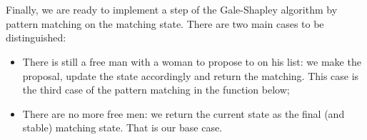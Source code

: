 {\begin{code}
\AgdaSpace{}%
\AgdaSymbol{(}\AgdaSpace{}%
\AgdaSpace{}%
\AgdaSymbol{)))}\<%
\\
%
\>[16]\AgdaOperator{\AgdaInductiveConstructor{,}}\<%
\\
%
\>[16]\AgdaSpace{}%
\AgdaSymbol{(}\AgdaSpace{}%
\AgdaSymbol{(}\AgdaSpace{}%
\AgdaOperator{\AgdaInductiveConstructor{,}}\AgdaSpace{}%
\AgdaSymbol{)}\AgdaSpace{}%
\AgdaSpace{}%
\AgdaSymbol{(}\AgdaSpace{}%
\AgdaSpace{}%
\AgdaSymbol{))}\<%
\end{code}

Finally, we are ready to implement a step of the Gale-Shapley algorithm by pattern matching on the matching state. There are two main cases to be distinguished:

\begin{itemize}
    \item There is still a free man with a woman to propose to on his list: we make the proposal, update the state accordingly and return the matching. This case is the third case of the pattern matching in the function below;
    \item There are no more free men: we return the current state as the final (and stable) matching state. That is our base case.
\end{itemize}

\begin{code}%
\>[0]\AgdaSpace{}%
\AgdaSymbol{:}\AgdaSpace{}%
\AgdaSpace{}%
\AgdaSpace{}%
\<%
\\
\>[0]\<%
\\
\>[0]%
\>[774I]\AgdaSymbol{(}\AgdaSpace{}%
\AgdaSpace{}%
\AgdaInductiveConstructor{[]}\AgdaSpace{}%
\AgdaSpace{}%
\AgdaSpace{}%
\AgdaSpace{}%
\AgdaSpace{}%
\AgdaSymbol{)}\AgdaSpace{}%
\AgdaSymbol{=}\<%
\\
\>[.][@{}l@{}]\<[774I]%
\>[5]\AgdaSpace{}%
\AgdaSpace{}%
\AgdaInductiveConstructor{[]}\AgdaSpace{}%
\AgdaSpace{}%
\AgdaSpace{}%
\AgdaSpace{}%
\AgdaSpace{}%
\<%
\end{code}

}
